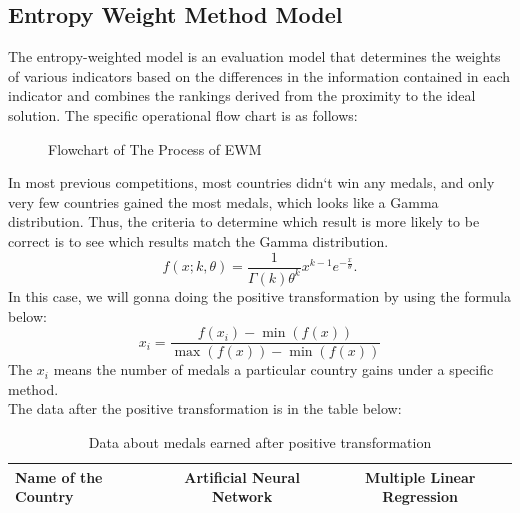 \documentclass{mcmthesis}
\begin{document}
\subsection{Entropy Weight Method Model}
The entropy-weighted model is an evaluation model that determines the weights of various indicators based on the differences in the information contained in each indicator and combines the rankings derived from the proximity to the ideal solution. The specific operational flow chart is as follows:\\
\begin{figure}[H]
\centering
{}
\caption{Flowchart of The Process of EWM}
\label{fig:flowchart}
\end{figure}
In most previous competitions, most countries didn`t win any medals, and only very few countries gained the most medals, which looks like a Gamma distribution. Thus, the criteria to determine which result is more likely to be correct is to see which results match the Gamma distribution.\\
\begin{equation}\label{eq:1}
f(x;k,\theta) =\frac{1}{\Gamma(k) \theta^k}x^{k-1}e^{-\frac{x}{\theta}}.
\end{equation}
In this case, we will gonna doing the positive transformation by using the formula below:
\begin{equation}\label{eq:1}
x_i = \frac{f(x_i) - \min(f(x))}{\max(f(x)) - \min(f(x))}
\end{equation}
The $x_i$ means the number of medals a particular country gains under a specific method.\\
The data after the positive transformation is in the table below:\\
\begin{table}[H]
\centering 
\label{A}
\caption{Data about medals earned after positive transformation}
\vspace{5pt}
\begin{tabular}{l|c|c}
\hline
Name of the Country & Artificial Neural Network & Multiple Linear Regression \\
\hline
\hline
\end{tabular}
\end{table}
\end{document}
